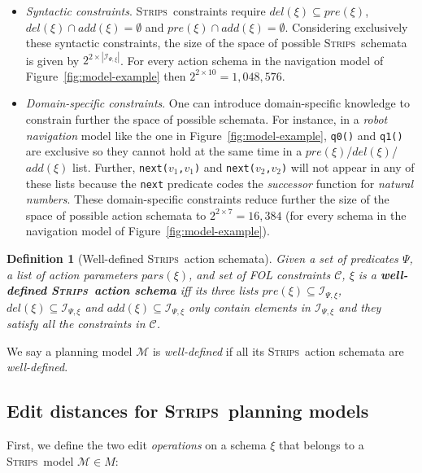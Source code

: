 \documentclass[letterpaper]{article} %
\newcommand{\strips}{\textsc{Strips}}     %
\newtheorem{definition}[theorem]{Definition}
\begin{document}
\begin{itemize}
\item {\em Syntactic constraints}. \strips\ constraints require $del(\xi)\subseteq pre(\xi)$, $del(\xi)\cap add(\xi)=\emptyset$ and $pre(\xi)\cap add(\xi)=\emptyset$. Considering exclusively these syntactic constraints, the size of the space of possible \strips\ schemata is given by $2^{2\times|{\mathcal I}_{\Psi,\xi}|}$. For every action schema in the navigation model of Figure~\ref{fig:model-example} then $2^{2\times 10}=1,048,576$.

\item {\em Domain-specific constraints}. One can introduce domain-specific knowledge to constrain further the space of possible schemata. For instance, in a {\em robot navigation} model like the one in Figure~\ref{fig:model-example}, {\small\tt q0()} and {\small\tt q1()} are exclusive so they cannot hold at the same time in a $pre(\xi)$/$del(\xi)$/$add(\xi)$ list. Further, {\small\tt next($v_1$,$v_1$)} and {\small\tt next($v_2$,$v_2$)} will not appear in any of these lists because the {\tt\small next} predicate codes the {\em successor} function for {\em natural numbers}. These domain-specific constraints reduce further the size of the space of possible action schemata to $2^{2\times 7}=16,384$ (for every schema in the navigation model of Figure~\ref{fig:model-example}).
\end{itemize}

\begin{definition}[Well-defined \strips\ action schemata]
Given a set of {\em predicates} $\Psi$, a list of action {\em parameters} $pars(\xi)$, and set of FOL constraints ${\mathcal C}$, $\xi$ is a {\bf well-defined \strips\ action schema} iff its three lists $pre(\xi)\subseteq {\mathcal I}_{\Psi,\xi}$, $del(\xi)\subseteq{\mathcal I}_{\Psi,\xi}$ and $add(\xi)\subseteq{\mathcal I}_{\Psi,\xi}$ only contain elements in ${\mathcal I}_{\Psi,\xi}$ and they satisfy all the constraints in ${\mathcal C}$.
\end{definition}

We say a planning model $\mathcal{M}$ is {\em well-defined} if all its \strips\ action schemata are {\em well-defined}.

\subsection{Edit distances for \strips\ planning models}
First, we define the two edit \emph{operations} on a schema $\xi$ that belongs to a \strips\ model $\mathcal{M}\in M$:
\end{document}
